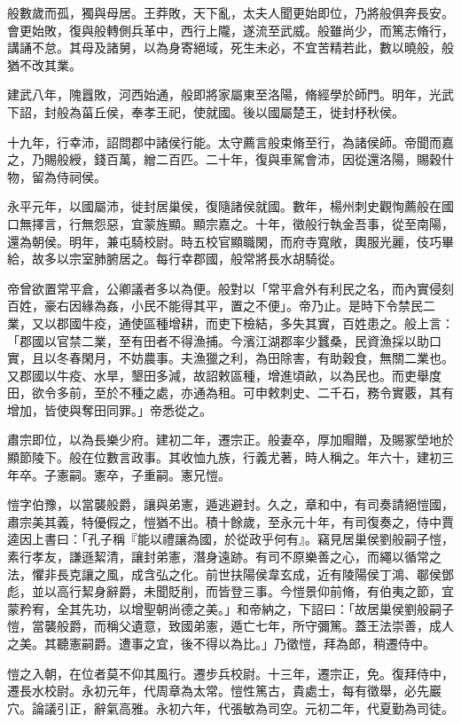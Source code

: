 \begin{pinyinscope}
般數歲而孤，獨與母居。王莽敗，天下亂，太夫人聞更始即位，乃將般俱奔長安。會更始敗，復與般轉側兵革中，西行上隴，遂流至武威。般雖尚少，而篤志脩行，講誦不怠。其母及諸舅，以為身寄絕域，死生未必，不宜苦精若此，數以曉般，般猶不改其業。

建武八年，隗囂敗，河西始通，般即將家屬東至洛陽，脩經學於師門。明年，光武下詔，封般為菑丘侯，奉孝王祀，使就國。後以國屬楚王，徙封杼秋侯。

十九年，行幸沛，詔問郡中諸侯行能。太守薦言般束脩至行，為諸侯師。帝聞而嘉之，乃賜般綬，錢百萬，繒二百匹。二十年，復與車駕會沛，因從還洛陽，賜穀什物，留為侍祠侯。

永平元年，以國屬沛，徙封居巢侯，復隨諸侯就國。數年，楊州刺史觀恂薦般在國口無擇言，行無怨惡，宜蒙旌顯。顯宗嘉之。十年，徵般行執金吾事，從至南陽，還為朝侯。明年，兼屯騎校尉。時五校官顯職閑，而府寺寬敞，輿服光麗，伎巧畢給，故多以宗室肺腑居之。每行幸郡國，般常將長水胡騎從。

帝曾欲置常平倉，公卿議者多以為便。般對以「常平倉外有利民之名，而內實侵刻百姓，豪右因緣為姦，小民不能得其平，置之不便」。帝乃止。是時下令禁民二業，又以郡國牛疫，通使區種增耕，而吏下檢結，多失其實，百姓患之。般上言：「郡國以官禁二業，至有田者不得漁捕。今濱江湖郡率少蠶桑，民資漁採以助口實，且以冬春閑月，不妨農事。夫漁獵之利，為田除害，有助穀食，無關二業也。又郡國以牛疫、水旱，墾田多減，故詔敕區種，增進頃畝，以為民也。而吏舉度田，欲令多前，至於不種之處，亦通為租。可申敕刺史、二千石，務令實覈，其有增加，皆使與奪田同罪。」帝悉從之。

肅宗即位，以為長樂少府。建初二年，遷宗正。般妻卒，厚加賵贈，及賜冢塋地於顯節陵下。般在位數言政事。其收恤九族，行義尤著，時人稱之。年六十，建初三年卒。子憲嗣。憲卒，子重嗣。憲兄愷。

愷字伯豫，以當襲般爵，讓與弟憲，遁逃避封。久之，章和中，有司奏請絕愷國，肅宗美其義，特優假之，愷猶不出。積十餘歲，至永元十年，有司復奏之，侍中賈逵因上書曰：「孔子稱『能以禮讓為國，於從政乎何有』。竊見居巢侯劉般嗣子愷，素行孝友，謙遜絜清，讓封弟憲，潛身遠跡。有司不原樂善之心，而繩以循常之法，懼非長克讓之風，成含弘之化。前世扶陽侯韋玄成，近有陵陽侯丁鴻、鄳侯鄧彪，並以高行絜身辭爵，未聞貶削，而皆登三事。今愷景仰前脩，有伯夷之節，宜蒙矜宥，全其先功，以增聖朝尚德之美。」和帝納之，下詔曰：「故居巢侯劉般嗣子愷，當襲般爵，而稱父遺意，致國弟憲，遁亡七年，所守彌篤。蓋王法崇善，成人之美。其聽憲嗣爵。遭事之宜，後不得以為比。」乃徵愷，拜為郎，稍遷侍中。

愷之入朝，在位者莫不仰其風行。遷步兵校尉。十三年，遷宗正，免。復拜侍中，遷長水校尉。永初元年，代周章為太常。愷性篤古，貴處士，每有徵舉，必先巖穴。論議引正，辭氣高雅。永初六年，代張敏為司空。元初二年，代夏勤為司徒。


\end{pinyinscope}
